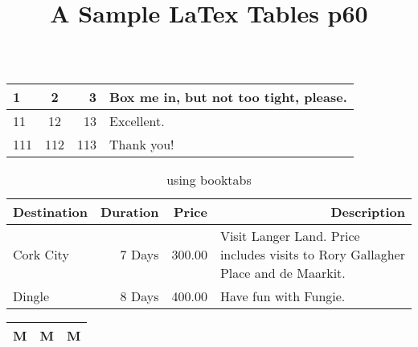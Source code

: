 \documentclass{vldb}
\begin{document}

\title{A Sample {\ttlit LaTex Tables p60}}
\maketitle

\begin{table}
       \caption{}
       \begin{tabular}[]{l|crp{3.1cm}} 

              \hline 
              1 & 2 & 3 & Box me in, but not too tight, please. \\
              \hline
              11 & 12 & 13 & Excellent. \\
              \cline{0-1}
              111 & 112 & 113 & Thank you! \\
              \hline 
       \end{tabular}
\end{table}

\begin{table}
       \caption{using booktabs}
       \begin{tabular}[c]{lrrp{47mm}} 
              \toprule \multicolumn{1}{r}{\textbf{Destination}} 
                     & \multicolumn{1}{r}{\textbf{Duration}}
                     & \multicolumn{1}{r}{\textbf{Price}} 
                     & \multicolumn{1}{r}{\textbf{Description}} \\
              \midrule
              Cork City  
              & 7 Days & 300.00
              & Visit Langer Land. Price includes visits 
              to Rory Gallagher Place and de Maarkit. \\
              \cmidrule[0.5pt](){0-1}
              Dingle
              & 8 Days & 400.00
              & Have fun with Fungie. \\
              \bottomrule 
       \end{tabular}
\end{table}

\begin{tabular*}{3cm}{@{}lcr@{}} 
       \toprule M & M & M \\
       \bottomrule 
\end{tabular*} 
\end{document}
